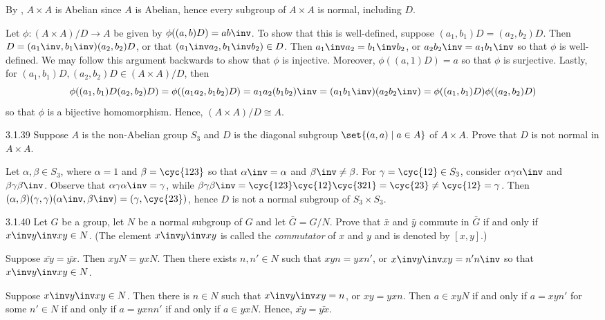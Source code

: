 \begin{sol}
    By , $A \times A$ is Abelian since $A$ is Abelian, hence every subgroup of $A \times A$ is normal, including $D$.

    Let $\phi : (A \times A)/D \to A$ be given by $\phi((a, b)D) = ab\inv$.
	To show that this is well-defined, suppose $(a_1, b_1)D = (a_2, b_2)D$.
	Then $D = (a_1\inv, b_1\inv)(a_2, b_2)D$, or that $(a_1\inv a_2, b_1\inv b_2) \in D$.
	Then $a_1\inv a_2 = b_1\inv b_2$, or $a_2b_2\inv = a_1b_1\inv$ so that $\phi$ is well-defined.
	We may follow this argument backwards to show that $\phi$ is injective.
	Moreover, $\phi((a, 1)D) = a$ so that $\phi$ is surjective.
	Lastly, for $(a_1, b_1)D, (a_2, b_2)D \in (A \times A)/D$, then
    \[
    	\phi((a_1, b_1)D (a_2, b_2)D) = \phi((a_1a_2, b_1b_2)D) = a_1a_2(b_1b_2)\inv = (a_1b_1\inv)(a_2b_2\inv) = \phi((a_1, b_1)D)\phi((a_2, b_2)D)
    \]
    so that $\phi$ is a bijective homomorphism.
	Hence, $(A \times A)/D \cong A$.
\end{sol}

\begin{exercise}{3.1.39}
    Suppose $A$ is the non-Abelian group $S_3$ and $D$ is the diagonal subgroup $\set{(a,a) \mid a \in A}$ of $A \times A$.
	Prove that $D$ is not normal in $A \times A$.
\end{exercise}

\begin{sol}
    Let $\alpha, \beta \in S_3$, where $\alpha = 1$ and $\beta = \cyc{1 2 3}$ so that $\alpha\inv = \alpha$ and $\beta\inv \neq \beta$.
	For $\gamma = \cyc{1 2} \in S_3$, consider $\alpha\gamma\alpha\inv$ and $\beta\gamma\beta\inv$.
	Observe that $\alpha\gamma\alpha\inv = \gamma$, while $\beta\gamma\beta\inv = \cyc{1 2 3}\cyc{1 2}\cyc{3 2 1} = \cyc{2 3} \neq \cyc{1 2} = \gamma$.
	Then $(\alpha, \beta)(\gamma, \gamma)(\alpha\inv, \beta\inv) = (\gamma, \cyc{2 3})$, hence $D$ is not a normal subgroup of $S_3 \times S_3$.
\end{sol}

\begin{spex}{3.1.40}
    Let $G$ be a group, let $N$ be a normal subgroup of $G$ and let $\bar{G} = G/N$.
	Prove that $\bar{x}$ and $\bar{y}$ commute in $\bar{G}$ if and only if $x\inv y\inv xy \in N$. (The element $x\inv y\inv xy$ is called the \emph{commutator} of $x$ and $y$ and is denoted by $[x,y]$.)
\end{spex}

\begin{soliff}[spsol]
    \rightimp Suppose $\bar{xy} = \bar{yx}$.
	Then $xyN = yxN$.
	Then there exists $n, n' \in N$ such that $xyn = yxn'$, or $x\inv y\inv xy = n'n\inv$ so that $x\inv y\inv xy \in N$.

    \leftimp Suppose $x\inv y\inv xy\in N$.
	Then there is $n \in N$ such that $x\inv y\inv xy = n$, or $xy = yxn$.
	Then $a \in xyN$ if and only if $a = xyn'$ for some $n' \in N$ if and only if $a = yxnn'$ if and only if $a \in yxN$.
	Hence, $\bar{xy} = \bar{yx}$.
\end{soliff}


